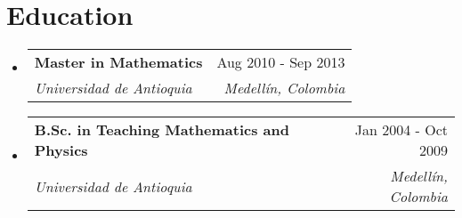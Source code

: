 \documentclass[letterpaper,11pt]{article}
\makeatletter
\newcommand{\resumeSubheading}[4]{
  \vspace{-2pt}
  \item[]
  \begin{tabular*}{\textwidth}{@{\extracolsep{\fill}}l r}
    \textbf{#1} & #2 \\
    \textit{#3} & \textit{#4} \\
  \end{tabular*}
  \vspace{-5pt}
}
\makeatother
\begin{document}
\section{Education}
\begin{itemize}[leftmargin=0pt, itemindent=0pt, label={}]
\resumeSubheading
{Master in Mathematics}{Aug 2010 - Sep 2013}
{Universidad de Antioquia}{Medellín, Colombia}

\resumeSubheading
{B.Sc. in Teaching Mathematics and Physics}{Jan 2004 - Oct 2009}
{Universidad de Antioquia}{Medellín, Colombia}
\end{itemize}
\end{document}
